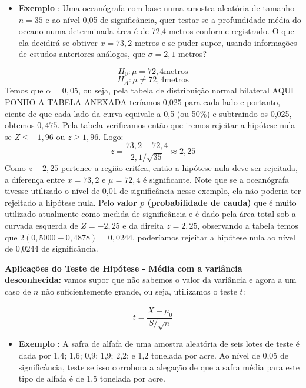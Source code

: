 \documentclass[
  openany]{book}
\providecommand{\tightlist}{%
  \setlength{\itemsep}{0pt}\setlength{\parskip}{0pt}}
\begin{document}
\begin{itemize}
\tightlist
\item
  \textbf{Exemplo} \citep{freund2009estatistica}: Uma oceanógrafa com base numa amostra aleatória de tamanho \(n=35\) e ao nível 0,05 de significância, quer testar se a profundidade média do oceano numa determinada área é de 72,4 metros conforme registrado. O que ela decidirá se obtiver \(\overline{x}=73,2\) metros e se puder supor, usando informações de estudos anteriores análogos, que \(\sigma=2,1\) metros?
\end{itemize}

\[H_0: \mu=72,4 \mbox{metros}\]
\[H_A: \mu \neq 72,4 \mbox{metros}\]
Temos que \(\alpha=0,05\), ou seja, pela tabela de distribuição normal bilateral AQUI PONHO A TABELA ANEXADA teríamos 0,025 para cada lado e portanto, ciente de que cada lado da curva equivale a 0,5 (ou 50\%) e subtraindo os 0,025, obtemos \(0,475\). Pela tabela verificamos então que iremos rejeitar a hipótese nula se \(Z \leq -1,96\) ou \(z \geq 1,96\). Logo:
\[z=\frac{73,2-72,4}{2,1/\sqrt{35}}\approx 2,25\]
Como \(z-2,25\) pertence a região critíca, então a hipótese nula deve ser rejeitada, a diferença entre \(\overline{x}=73,2\) e \(\mu=72,4\) é significante. Note que se a oceanógrafa tivesse utilizado o nível de 0,01 de significância nesse exemplo, ela não poderia ter rejeitado a hipótese nula. Pelo \textbf{valor \(p\) (probabilidade de cauda)} que é muito utilizado atualmente como medida de significância e é dado pela área total sob a curvada esquerda de \(Z=-2,25\) e da direita \(z=2,25\), observando a tabela temos que \(2(0,5000-0,4878)=0,0244\), poderíamos rejeitar a hipótese nula ao nível de 0,0244 de significância.

\textbf{Aplicações do Teste de Hipótese - Média com a variância desconhecida:} vamos supor que não sabemos o valor da variância e agora a um caso de \(n\) não suficientemente grande, ou seja, utilizamos o teste \(t\):

\begin{equation} 
t=\frac{\overline{X}-\mu_0}{S/\sqrt{n}}
  \label{eq:testehipvardesc}
\end{equation}

\begin{itemize}
\tightlist
\item
  \textbf{Exemplo} \citep{freund2009estatistica}: A safra de alfafa de uma amostra aleatória de seis lotes de teste é dada por 1,4; 1,6; 0,9; 1,9; 2,2; e 1,2 tonelada por acre. Ao nível de 0,05 de significância, teste se isso corrobora a alegação de que a safra média para este tipo de alfafa é de 1,5 tonelada por acre.
\end{itemize}
\end{document}

